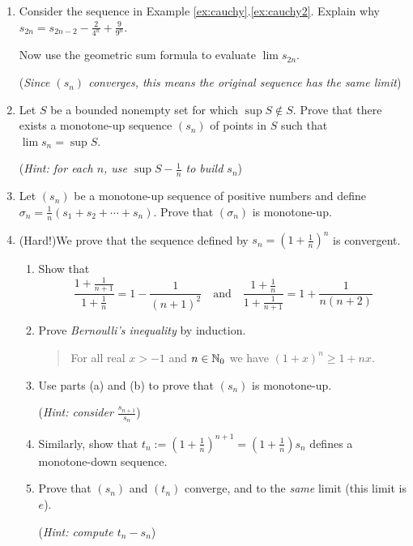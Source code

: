 \begin{exercises}{}{}
\begin{enumerate}
	  
	  \item\label{exs:cauchygeomeval} Consider the sequence in Example \ref*{ex:cauchy}.\ref{ex:cauchy2}. Explain why $s_{2n}=s_{2n-2}-\frac 2{4^n}+\frac 9{9^n}$.\par
	  Now use the geometric sum formula to evaluate $\lim s_{2n}$.\par
	  (\emph{Since $(s_n)$ converges, this means the original sequence has the same limit})
	  
	  
	  \item%
	  Let $S$ be a bounded nonempty set for which $\sup S\notin S$. Prove that there exists a monotone-up sequence $(s_n)$ of points in $S$ such that $\lim s_n=\sup S$.\par
	  (\emph{Hint: for each $n$, use $\sup S-\frac 1n$ to build $s_n$})
	  
	  
	  \item%
	  Let $(s_n)$ be a monotone-up sequence of positive numbers and define $\sigma_n=\frac 1n(s_1+s_2+\cdots+s_n)$. Prove that $(\sigma_n)$ is monotone-up.
	
	  
	  
	  \item\label{exs:edefn} (Hard!)\lstsp We prove that the sequence defined by $s_n=\left(1+\frac 1n\right)^n$ is convergent.
	  \begin{enumerate}
	    \item Show that
	    \[\frac{1+\frac 1{n+1}}{1+\frac 1n}=1-\frac 1{(n+1)^2}\quad \text{and}\quad \frac{1+\frac 1n}{1+\frac 1{n+1}}=1+\frac 1{n(n+2)}\]
		  \item Prove \emph{Bernoulli's inequality} by induction.
		  \begin{quote}
		  	For all real $x>-1$ and $n\in\mathbb{N}_0$ we have $(1+x)^n\ge 1+nx$.
		  \end{quote}
			\item Use parts (a) and (b) to prove that $(s_n)$ is monotone-up.\par
			(\emph{Hint: consider $\frac{s_{n+1}}{s_n}$}) 
			\item Similarly, show that $t_n:=\left(1+\frac 1n\right)^{n+1} =\left(1+\frac 1n\right)s_n$ defines a monotone-down sequence.
			\item Prove that $(s_n)$ and $(t_n)$ converge, and to the \emph{same} limit (this limit is $e$).\par
			(\emph{Hint: compute $t_n-s_n$})
		\end{enumerate}
	  
	
	

\end{enumerate}
\end{exercises}
